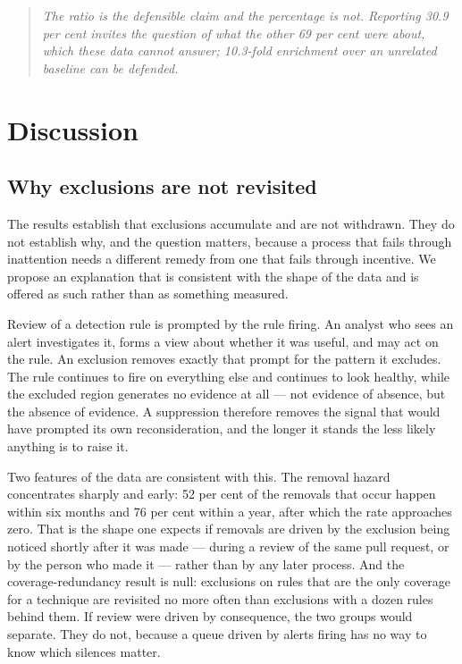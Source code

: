\begin{quote}\itshape
The ratio is the defensible claim and the percentage is not. Reporting 30.9 per cent invites the question of what the other 69 per cent were about, which these data cannot answer; 10.3-fold enrichment over an unrelated baseline can be defended.
\end{quote}

\section{Discussion}
\label{sec:discussion}

\subsection{Why exclusions are not revisited}

The results establish that exclusions accumulate and are not withdrawn. They do not establish why, and the question matters, because a process that fails through inattention needs a different remedy from one that fails through incentive. We propose an explanation that is consistent with the shape of the data and is offered as such rather than as something measured.

Review of a detection rule is prompted by the rule firing. An analyst who sees an alert investigates it, forms a view about whether it was useful, and may act on the rule. An exclusion removes exactly that prompt for the pattern it excludes. The rule continues to fire on everything else and continues to look healthy, while the excluded region generates no evidence at all --- not evidence of absence, but the absence of evidence. A suppression therefore removes the signal that would have prompted its own reconsideration, and the longer it stands the less likely anything is to raise it.

Two features of the data are consistent with this. The removal hazard concentrates sharply and early: 52 per cent of the removals that occur happen within six months and 76 per cent within a year, after which the rate approaches zero. That is the shape one expects if removals are driven by the exclusion being noticed shortly after it was made --- during a review of the same pull request, or by the person who made it --- rather than by any later process. And the coverage-redundancy result is null: exclusions on rules that are the only coverage for a technique are revisited no more often than exclusions with a dozen rules behind them. If review were driven by consequence, the two groups would separate. They do not, because a queue driven by alerts firing has no way to know which silences matter.

